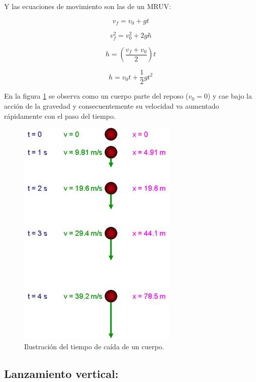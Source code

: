 \documentclass[a5paper,pagesize,10pt,bibtotoc,pointlessnumbers,
normalheadings,DIV=9,fleqn,x11names,table,twoside=false]{scrbook}
\begin{document}
Y las ecuaciones de movimiento son las de un MRUV:

\begin{equation}
 v_f = v_0 + gt
\end{equation}

\begin{equation}
 v_f^2 = v_0^2 + 2gh
\end{equation}

\begin{equation}
 h = (\frac{v_f + v_0}{2})t
\end{equation}

\begin{equation}
 h = v_0t + \frac{1}{2}gt^2
\end{equation}

En la figura \ref{caidalibre2} se observa como un cuerpo parte del reposo ($v_0 = 0$) y cae bajo la acción de la gravedad y 
consecuentemente su velocidad va aumentado rápidamente con el paso del tiempo.
 
\begin{figure}[ht]
 \centering
 \includegraphics[scale=0.4]{images/freefall-timeline-large.jpg}
 \caption{Ilustración del tiempo de caída de un cuerpo.}\label{caidalibre2}
\end{figure}  
 
\subsection{Lanzamiento vertical:}
\end{document}
